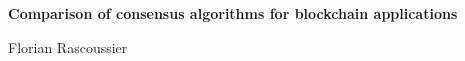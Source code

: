 \begin{titlepage}
    \begin{center}
        \vspace{2cm}
        
        \Huge
        \textbf{Comparison of consensus algorithms for blockchain applications}
            
        \vspace{2cm}
        \Large
        Florian Rascoussier
        
    \end{center}
\end{titlepage}